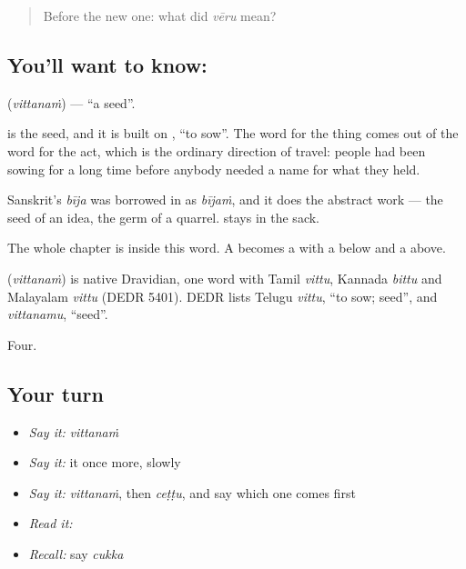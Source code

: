 \label{lesson:TE-C54-seed}



\begin{quote}
Before the new one: what did \emph{vēru} mean?
\end{quote}

\subsection*{You'll want to know: }
\textbf{} (\emph{vittanaṁ}) — \textquotedblleft{}a seed\textquotedblright{}.

 is the seed, and it is built on , \textquotedblleft{}to sow\textquotedblright{}. The word for the thing comes out of the word for the act, which is the ordinary direction of travel: people had been sowing for a long time before anybody needed a name for what they held.

Sanskrit's \emph{bīja} was borrowed in as \emph{bījaṁ}, and it does the abstract work — the seed of an idea, the germ of a quarrel.  stays in the sack.

The whole chapter is inside this word. A  becomes a  with a  below and a  above.

\begin{cousinweb}
\textbf{} (\emph{vittanaṁ}) is native Dravidian, one word with Tamil \emph{vittu}, Kannada \emph{bittu} and Malayalam \emph{vittu} (DEDR 5401). DEDR lists Telugu \emph{vittu}, \textquotedblleft{}to sow; seed\textquotedblright{}, and \emph{vittanamu}, \textquotedblleft{}seed\textquotedblright{}.
\end{cousinweb}

\begin{grammarlens}[title={What you've built}]
Four.
\end{grammarlens}

\subsection*{Your turn}
\begin{itemize}
\raggedright
  \item \emph{Say it:} \emph{vittanaṁ}
  \item \emph{Say it:} it once more, slowly
  \item \emph{Say it:} \emph{vittanaṁ}, then \emph{ceṭṭu}, and say which one comes first
  \item \emph{Read it:} \textbf{}
  \item \emph{Recall:} say \emph{cukka}
\end{itemize}

